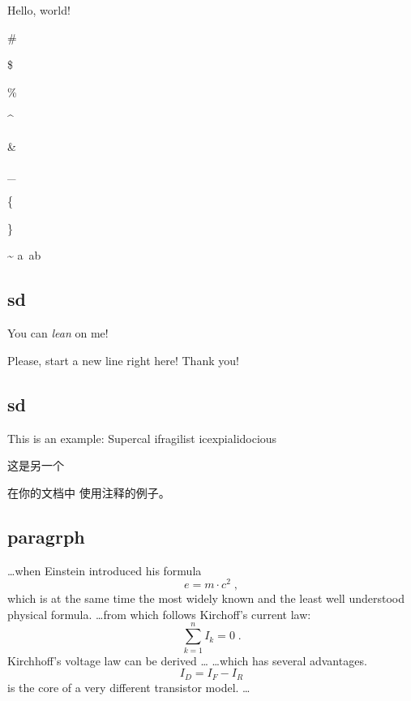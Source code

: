 \documentclass{article}
\begin{document}
Hello, world!

\# 

\$ 

\% 

\^ {}

\&

 \_ 

\{ 

\} 

\~{} 
a~{ab}

\subsection{sd}

You can \textsl{lean} on me! 

Please, start a new line
right here!\newline
Thank you!

\subsection{sd}
This is an %
example: Supercal%
               ifragilist%
              icexpialidocious

这是另一个
\begin{comment}
非常笨拙的，
然而却很有效。
\end{comment}
在你的文档中
使用注释的例子。


\subsection{paragrph}
\ldots when Einstein introduced his formula
\begin{equation}
e = m \cdot c^2 \; ,
\end{equation}
which is at the same time the most widely known
and the least well understood physical formula.
\ldots from which follows Kirchoff’s current law:
\begin{equation}
\sum_{k=1}^{n} I_k = 0 \; .
\end{equation}
Kirchhoff’s voltage law can be derived \ldots
\ldots which has several advantages.
\begin{equation}
I_D = I_F - I_R
\end{equation}
is the core of a very different transistor model. \ldots
\end{document}
